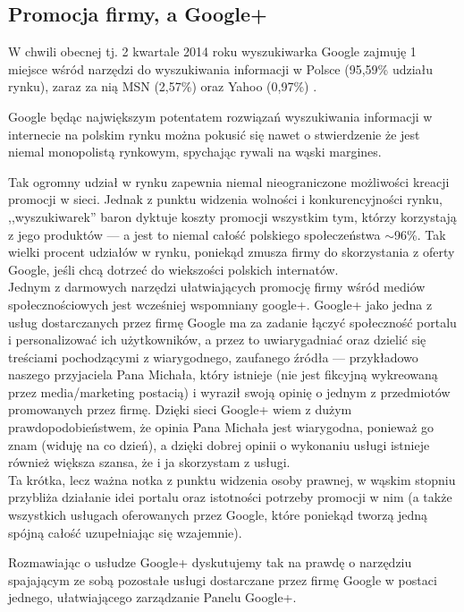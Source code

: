 
\subsection{Promocja firmy, a Google+}
W chwili obecnej tj. 2 kwartale 2014 roku wyszukiwarka Google zajmuję 1 miejsce wśród narzędzi do wyszukiwania informacji w Polsce (95,59\% udziału rynku), zaraz za nią MSN (2,57\%) oraz Yahoo (0,97\%) \cite{url:gemius-ranking-silnikow-wyszukiwarek}.

Google będąc największym potentatem rozwiązań wyszukiwania informacji w internecie na polskim rynku można pokusić się nawet o stwierdzenie że jest niemal monopolistą rynkowym, spychając rywali na wąski margines.

Tak ogromny udział w rynku zapewnia niemal nieograniczone możliwości kreacji promocji w sieci. Jednak z punktu widzenia wolności i konkurencyjności rynku, ,,wyszukiwarek'' baron dyktuje koszty promocji wszystkim tym, którzy korzystają z jego produktów --- a jest to niemal całość polskiego społeczeństwa $\sim$96\%. Tak wielki procent udziałów w rynku, poniekąd zmusza firmy do skorzystania z oferty Google, jeśli chcą dotrzeć do wiekszości polskich internatów. \\


Jednym z darmowych narzędzi ułatwiających promocję firmy wśród mediów społecznościowych jest wcześniej wspomniany google+. Google+ jako jedna z usług dostarczanych przez firmę Google ma za zadanie łączyć społeczność portalu i personalizować ich użytkowników, a przez to uwiarygadniać oraz dzielić się treściami pochodzącymi z wiarygodnego, zaufanego źródła --- przykładowo naszego przyjaciela Pana Michała, który istnieje (nie jest fikcyjną wykreowaną przez media/marketing postacią) i wyraził swoją opinię o jednym z przedmiotów promowanych przez firmę. Dzięki sieci Google+ wiem z dużym prawdopodobieństwem, że opinia Pana Michała jest wiarygodna, ponieważ go znam (widuję na co dzień), a dzięki dobrej opinii o wykonaniu usługi istnieje również większa szansa, że i ja skorzystam z usługi.\\

Ta krótka, lecz ważna notka z punktu widzenia osoby prawnej, w wąskim stopniu przybliża działanie idei portalu oraz istotności potrzeby promocji w nim (a także wszystkich usługach oferowanych przez Google, które poniekąd tworzą jedną spójną całość uzupełniając się wzajemnie). 

Rozmawiając o usłudze Google+ dyskutujemy tak na prawdę o narzędziu spajającym ze sobą pozostałe usługi dostarczane przez firmę Google w postaci jednego, ułatwiającego zarządzanie Panelu Google+.

